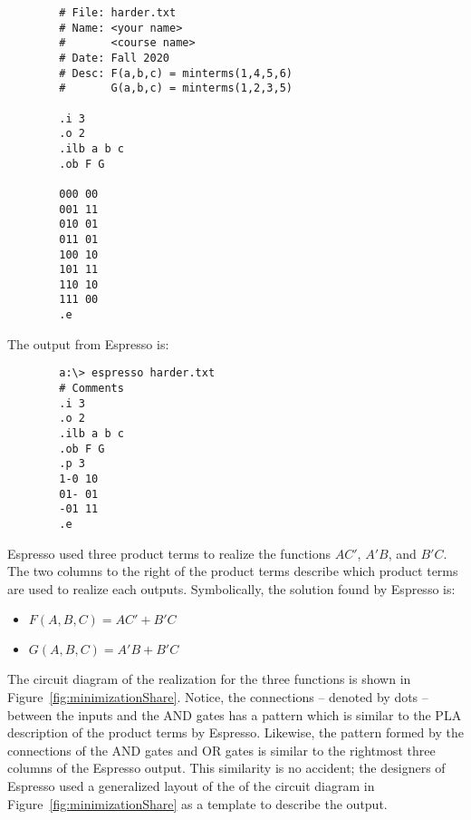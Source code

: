 \begin{verbatim}
        # File: harder.txt
        # Name: <your name>
        #       <course name>
        # Date: Fall 2020
        # Desc: F(a,b,c) = minterms(1,4,5,6)
        #       G(a,b,c) = minterms(1,2,3,5)

        .i 3
        .o 2
        .ilb a b c
        .ob F G

        000 00
        001 11
        010 01
        011 01
        100 10
        101 11
        110 10
        111 00
        .e
\end{verbatim}

The output from Espresso is:
\begin{verbatim}
        a:\> espresso harder.txt
        # Comments
        .i 3
        .o 2
        .ilb a b c
        .ob F G
        .p 3
        1-0 10
        01- 01
        -01 11
        .e
\end{verbatim}

Espresso used three product terms to realize the functions $AC'$, $A'B$,
and $B'C$.  The two columns to the right of the product terms
describe which product terms are used to realize each outputs.
Symbolically, the solution found by Espresso is:
\begin{itemize}
\item $F(A,B,C)= AC' + B'C$
\item $G(A,B,C)= A'B + B'C $
\end{itemize}

The circuit diagram of the realization for the three functions is
shown in Figure~\ref{fig:minimizationShare}.  Notice, the connections --
denoted by dots -- between the inputs and the AND gates has a pattern
which is similar to the PLA description of the product terms by
Espresso.  Likewise, the pattern formed by the connections of the AND
gates and OR gates is similar to the rightmost three columns of the
Espresso output.  This similarity is no accident; the designers of Espresso
used a generalized layout of the of the circuit diagram in
Figure~\ref{fig:minimizationShare} as a template to describe the output.

